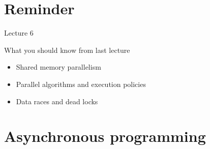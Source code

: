 \documentclass[\classoption]{beamer}
\title{\coursename}
\subtitle{Lecture 7: Asynchronous programming }
\author{\tiny Patrick Diehl \orcid{0000-0003-3922-8419}}
\date {
 \tiny \url{\courseurl}
\vspace{2cm}
\doclicenseThis  
  
}
\begin{document}
 {
    \frame {
        \titlepage
    }
}

\frame{

\tableofcontents

}


\section{Reminder}
\begin{frame}{Lecture 6}
\begin{block}{What you should know from last lecture}
\begin{itemize}
\item Shared memory parallelism
\item Parallel algorithms and execution policies
\item Data races and dead locks
\end{itemize}
\end{block}
\end{frame}


\section{Asynchronous programming}
\end{document}
